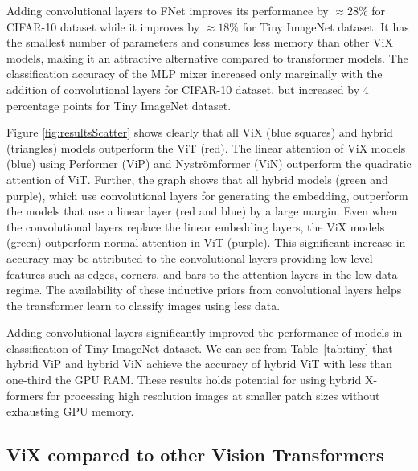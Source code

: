 \documentclass{article}
\begin{document}
Adding convolutional layers to FNet improves its performance by $\approx 28 \%$ for CIFAR-10 dataset while it improves by $\approx 18 \%$ for Tiny ImageNet dataset. It has the smallest number of parameters and consumes less memory than other ViX models, making it an attractive alternative compared to transformer models. The classification accuracy of the MLP mixer increased only marginally with the addition of convolutional layers for CIFAR-10 dataset, but increased by 4 percentage points for Tiny ImageNet dataset. 



Figure \ref{fig:resultsScatter} shows clearly that all ViX (blue squares) and hybrid (triangles) models outperform the ViT (red). The linear attention of ViX models (blue) using Performer (ViP) and Nyströmformer (ViN) outperform the quadratic attention of ViT. Further, the graph shows that all hybrid models (green and purple), which use convolutional layers for generating the embedding, outperform the models that use a linear layer (red and blue) by a large margin. Even when the convolutional layers replace the linear embedding layers, the ViX models (green) outperform normal attention in ViT (purple). This significant increase in accuracy may be attributed to the convolutional layers providing low-level features such as edges, corners, and bars to the attention layers in the low data regime. The availability of these inductive priors from convolutional layers helps the transformer learn to classify images using less data. 





Adding convolutional layers significantly improved the performance of models in classification of Tiny ImageNet dataset. We can see from Table~\ref{tab:tiny} that hybrid ViP and hybrid ViN achieve the accuracy of hybrid ViT with less than one-third the GPU RAM. These results holds potential for using hybrid X-formers for processing high resolution images at smaller patch sizes without exhausting GPU memory. 



\subsection{ViX compared to other Vision Transformers}
\end{document}

